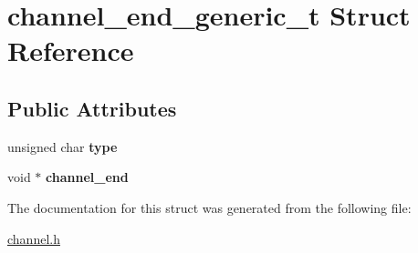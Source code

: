 \hypertarget{structchannel__end__generic__t}{\section{channel\-\_\-end\-\_\-generic\-\_\-t Struct Reference}
\label{structchannel__end__generic__t}
}
\subsection*{Public Attributes}
\begin{DoxyCompactItemize}
\item 
\hypertarget{structchannel__end__generic__t_a0f1124e61811509f41d974b1df7a3bfc}{unsigned char {\bfseries type}}\label{structchannel__end__generic__t_a0f1124e61811509f41d974b1df7a3bfc}

\item 
\hypertarget{structchannel__end__generic__t_aef84ec65d166ccf7a193fa19bcb052a1}{void $\ast$ {\bfseries channel\-\_\-end}}\label{structchannel__end__generic__t_aef84ec65d166ccf7a193fa19bcb052a1}

\end{DoxyCompactItemize}


The documentation for this struct was generated from the following file\-:\begin{DoxyCompactItemize}
\item 
\hyperlink{channel_8h}{channel.\-h}\end{DoxyCompactItemize}
